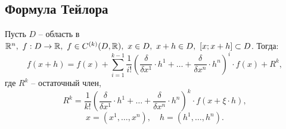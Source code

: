 \subsection{Формула Тейлора}

\begin{theorem}
    Пусть $D$ -- область в $\mathbb{R}^n, \ f:D\rightarrow\mathbb{R}, \ f\in C^{(k)}(D,\mathbb{R}), \ x \in D, \ x + h \in D, \ [x;x+h] \subset D$. Тогда:
    \[
        f(x + h) = f(x) + \sum_{i=1}^{k-1}\frac{1}{i!}\left(\frac{\delta}{\delta x^1}\cdot h^1 + \ldots + \frac{\delta}{\delta x^n}\cdot h^n\right)^i \cdot f(x) + R^k,
    \]
    где $R^k$ -- остаточный член,
    \[
        R^k = \frac{1}{k!}\left(\frac{\delta}{\delta x^1}\cdot h^1 + \ldots + \frac{\delta}{\delta x^n}\cdot h^n\right)^k \cdot f(x + \xi \cdot h),
    \]
    \[
        x = (x^1,\ldots,x^n), \quad h = (h^1,\ldots,h^n).
    \]
\end{theorem}

